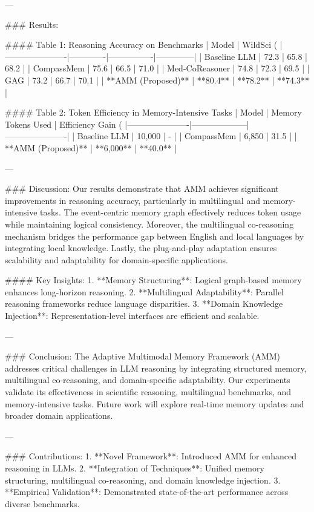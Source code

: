 ---

### Results:

#### Table 1: Reasoning Accuracy on Benchmarks
| Model                | WildSci (%
|----------------------|-------------|----------------|--------------|
| Baseline LLM         | 72.3        | 65.8           | 68.2         |
| CompassMem           | 75.6        | 66.5           | 71.0         |
| Med-CoReasoner       | 74.8        | 72.3           | 69.5         |
| GAG                  | 73.2        | 66.7           | 70.1         |
| **AMM (Proposed)**   | **80.4**    | **78.2**       | **74.3**     |

#### Table 2: Token Efficiency in Memory-Intensive Tasks
| Model                | Memory Tokens Used | Efficiency Gain (%
|----------------------|--------------------|----------------------|
| Baseline LLM         | 10,000            | -                    |
| CompassMem           | 6,850             | 31.5                 |
| **AMM (Proposed)**   | **6,000**         | **40.0**             |

---

### Discussion:
Our results demonstrate that AMM achieves significant improvements in reasoning accuracy, particularly in multilingual and memory-intensive tasks. The event-centric memory graph effectively reduces token usage while maintaining logical consistency. Moreover, the multilingual co-reasoning mechanism bridges the performance gap between English and local languages by integrating local knowledge. Lastly, the plug-and-play adaptation ensures scalability and adaptability for domain-specific applications.

#### Key Insights:
1. **Memory Structuring**: Logical graph-based memory enhances long-horizon reasoning.
2. **Multilingual Adaptability**: Parallel reasoning frameworks reduce language disparities.
3. **Domain Knowledge Injection**: Representation-level interfaces are efficient and scalable.

---

### Conclusion:
The Adaptive Multimodal Memory Framework (AMM) addresses critical challenges in LLM reasoning by integrating structured memory, multilingual co-reasoning, and domain-specific adaptability. Our experiments validate its effectiveness in scientific reasoning, multilingual benchmarks, and memory-intensive tasks. Future work will explore real-time memory updates and broader domain applications.

---

### Contributions:
1. **Novel Framework**: Introduced AMM for enhanced reasoning in LLMs.
2. **Integration of Techniques**: Unified memory structuring, multilingual co-reasoning, and domain knowledge injection.
3. **Empirical Validation**: Demonstrated state-of-the-art performance across diverse benchmarks.

